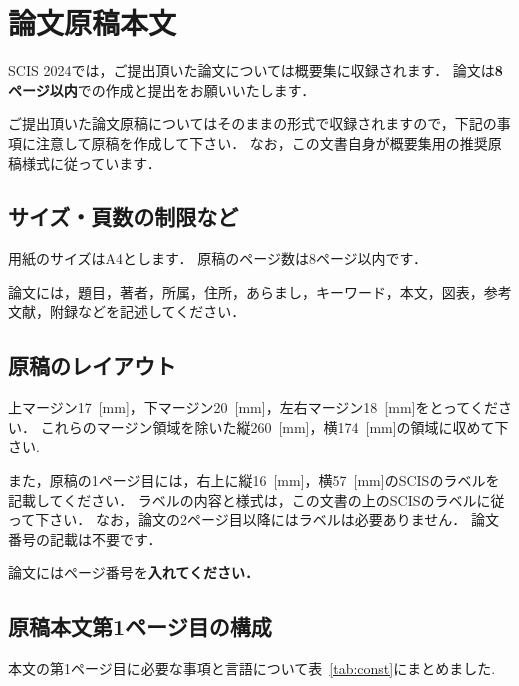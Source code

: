 \documentclass{jarticle} %
\begin{document}
\section{論文原稿本文}

SCIS 2024では，ご提出頂いた論文については概要集に収録されます．
論文は\textbf{8ページ以内}での作成と提出をお願いいたします．

ご提出頂いた論文原稿についてはそのままの形式で収録されますので，下記の事項に注意して原稿を作成して下さい．
なお，この文書自身が概要集用の推奨原稿様式に従っています．


\subsection{サイズ・頁数の制限など}

用紙のサイズはA4とします．
原稿のページ数は8ページ以内です．


論文には，題目，著者，所属，住所，あらまし，キーワード，本文，図表，参考文献，附録などを記述してください．


\subsection{原稿のレイアウト}

上マージン17~[mm]，下マージン20~[mm]，左右マージン18~[mm]をとってください．
これらのマージン領域を除いた縦260~[mm]，横174~[mm]の領域に収めて下さい.

また，原稿の1ページ目には，右上に縦16~[mm]，横57~[mm]のSCISのラベルを記載してください．
ラベルの内容と様式は，この文書の上のSCISのラベルに従って下さい．
なお，論文の2ページ目以降にはラベルは必要ありません．
論文番号の記載は不要です．

論文にはページ番号を\textbf{入れてください．}


\subsection{原稿本文第1ページ目の構成}

本文の第1ページ目に必要な事項と言語について表~\ref{tab:const}にまとめました.
\end{document}
